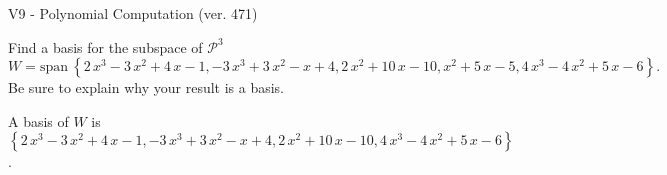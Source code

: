 \begin{exercise}
  \begin{exerciseTitle}V9 - Polynomial Computation (ver. 471)\end{exerciseTitle}
  \begin{exerciseStatement}
    Find a basis for the subspace of \(\mathcal{P}^3\) 
\[W=\mathrm{span}\ \left\{2 \, x^{3} - 3 \, x^{2} + 4 \, x - 1 , -3 \, x^{3} + 3 \, x^{2} - x + 4 , 2 \, x^{2} + 10 \, x - 10 , x^{2} + 5 \, x - 5 , 4 \, x^{3} - 4 \, x^{2} + 5 \, x - 6\right\}.\]
 Be sure to explain why your result is a basis.


  \end{exerciseStatement}
  \begin{exerciseAnswer}
   A basis of \(W\) is  \(\left\{2 \, x^{3} - 3 \, x^{2} + 4 \, x - 1 , -3 \, x^{3} + 3 \, x^{2} - x + 4 , 2 \, x^{2} + 10 \, x - 10 , 4 \, x^{3} - 4 \, x^{2} + 5 \, x - 6\right\}\).
  


  \end{exerciseAnswer}
\end{exercise}